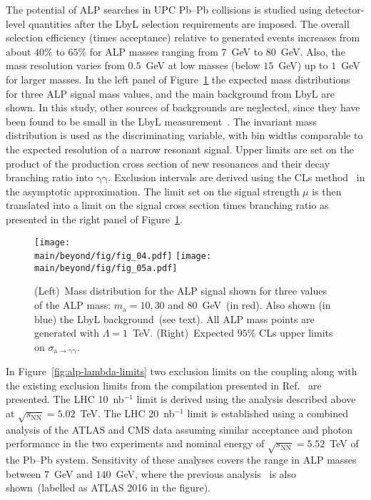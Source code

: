 The potential of ALP searches in UPC Pb--Pb collisions is studied using detector-level quantities after the LbyL selection requirements are imposed. The overall selection efficiency (times acceptance) relative to generated events increases from about $40$\% to $65$\% for ALP masses ranging from $7$~GeV to $80$~GeV. Also, the mass resolution varies from $0.5$~GeV at low masses (below $15$~GeV) up to $1$~GeV for larger masses. In the left panel of Figure~\ref{fig:alp} the expected mass distributions for three ALP signal mass values, and the main background from LbyL are shown. In this study, other sources of backgrounds are neglected, since they have been found to be small in the LbyL measurement~\cite{Aaboud:2017bwk}. The invariant mass distribution is used as the discriminating variable, with bin widths comparable to the expected resolution of a narrow resonant signal.
Upper limits are set on the product of the production cross section of
new resonances and their decay branching ratio into $\mathrm{\gamma\gamma}$. Exclusion intervals are derived using the CLs method~\cite{Read:2002hq} in the asymptotic approximation. The limit set on the signal strength $\mu$ is then translated into a limit on the signal cross section times branching ratio as presented in the right panel of Figure~\ref{fig:alp}.
\begin{figure}[!htbp]
\centering
  \texttt{[image: \\main/beyond/fig/fig\_04.pdf]}
  \texttt{[image: \\main/beyond/fig/fig\_05a.pdf]}
  \caption{(Left)~Mass distribution for the ALP signal
  shown for three values of the ALP mass: $m_\mathrm{a}=10, 30$ and
  $80$~GeV~(in red). Also shown (in blue) the LbyL background~(see
  text). All ALP mass points are generated with $\Lambda = 1$~TeV.
  (Right)~Expected $95$\% CLs upper limits on $\sigma_{\mathrm{a\rightarrow \gamma \gamma}}$.}
  \label{fig:alp}
\end{figure}

In Figure~\ref{fig:alp-lambda-limits} two exclusion limits on the coupling along with the existing exclusion limits from the compilation presented in Ref.~\cite{Baldenegro:2018hng} are presented. The LHC 10~nb$^{-1}$ limit is derived using the analysis described above at $\sqrt{s_{\mathrm{NN}}}=5.02$~TeV. The LHC 20~nb$^{-1}$ limit is established using a combined analysis of the ATLAS and CMS data assuming similar acceptance and photon performance in the two experiments and nominal energy of $\sqrt{s_{\mathrm{NN}}}=5.52$~TeV of the Pb--Pb system.
Sensitivity of these analyses covers the range in ALP masses between $7$~GeV and $140$~GeV, where the previous analysis~\cite{Knapen:2016moh} is also shown~(labelled as ATLAS 2016 in the figure).

